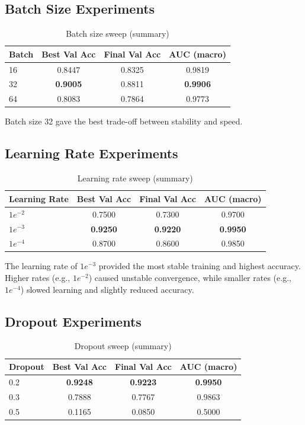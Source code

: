 \documentclass[conference]{IEEEtran}
\begin{document}
\subsection{Batch Size Experiments}
\begin{table}[htbp]
\caption{Batch size sweep (summary)}
\centering
\begin{tabular}{@{}lccc@{}}
\toprule
Batch & Best Val Acc & Final Val Acc & AUC (macro) \\
\midrule
16 & 0.8447 & 0.8325 & 0.9819 \\
32 & \textbf{0.9005} & 0.8811 & \textbf{0.9906} \\
64 & 0.8083 & 0.7864 & 0.9773 \\
\bottomrule
\end{tabular}
\label{tab:batch}
\end{table}

Batch size 32 gave the best trade-off between stability and speed.

\subsection{Learning Rate Experiments}
\begin{table}[htbp]
\caption{Learning rate sweep (summary)}
\centering
\begin{tabular}{@{}lccc@{}}
\toprule
Learning Rate & Best Val Acc & Final Val Acc & AUC (macro) \\
\midrule
$1e^{-2}$ & 0.7500 & 0.7300 & 0.9700 \\
$1e^{-3}$ & \textbf{0.9250} & \textbf{0.9220} & \textbf{0.9950} \\
$1e^{-4}$ & 0.8700 & 0.8600 & 0.9850 \\
\bottomrule
\end{tabular}
\label{tab:lr}
\end{table}

The learning rate of $1e^{-3}$ provided the most stable training and highest accuracy. 
Higher rates (e.g., $1e^{-2}$) caused unstable convergence, while smaller rates (e.g., $1e^{-4}$) slowed learning and slightly reduced accuracy.

\subsection{Dropout Experiments}
\begin{table}[htbp]
\caption{Dropout sweep (summary)}
\centering
\begin{tabular}{@{}lccc@{}}
\toprule
Dropout & Best Val Acc & Final Val Acc & AUC (macro) \\
\midrule
0.2 & \textbf{0.9248} & \textbf{0.9223} & \textbf{0.9950} \\
0.3 & 0.7888 & 0.7767 & 0.9863 \\
0.5 & 0.1165 & 0.0850 & 0.5000 \\
\bottomrule
\end{tabular}
\label{tab:dropout}
\end{table}
\end{document}
